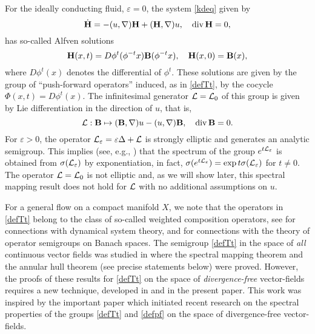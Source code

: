 For the ideally conducting fluid, $\varepsilon =0$,
the system \eqref{kdeq} given by
\begin{equation}\lb{kde}
\dot{\bH}= - (u,\nabla) {\bH} +
( {\bH}, \nabla ) u,
\quad \div{\bH}  = 0,
\end{equation}
has \cite{Moffatt} so-called Alfven solutions
\begin{equation}\lb{defpf}
{\bH}(x,t)=D\phi^t(\phi^{-t}x){\bB} (\phi^{-t}x),
\quad {\bH}(x,0)={\bB}(x),
\end{equation}
where $D\phi^t(x)$  denotes the differential of $\phi^t$.
These solutions are given by the group of ``push-forward
operators'' induced, as in \eqref{defTt},
by the cocycle $\Phi(x,t)=D\phi^t(x)$.
The infinitesimal generator
${\cal{L}}={\cal{L}}_0$ of this group is given by Lie differentiation
in the direction of $u$, that is,
\begin{equation}\lb{defL}
\calL: \bB\mapsto  (\bB,\nabla)u - (u,\nabla) \bB,\quad \div\bB=0.
\end{equation}
For $\varepsilon >0$, the operator 
${\cal{L}}_\varepsilon=\varepsilon\Delta+{\cal{L}}$ is strongly elliptic
and generates an analytic semigroup. This implies (see, e.g., \cite{Pazy})
that the spectrum of the group $e^{t{\cal{L}}_\varepsilon}$ is obtained 
from $\sigma({\cal{L}}_\varepsilon)$ by exponentiation, 
in fact,
$\sigma(e^{t{\cal{L}}_\varepsilon}) = \exp t\sigma ({\cal{L}}_\varepsilon)$ for $t\neq 0$.
The operator ${\cal{L}}={\cal{L}}_0$ is not elliptic and, as we will show later,
this spectral mapping
result does not hold for ${\cal{L}}$ with no additional assumptions on $u$. 


For a general flow on a compact manifold $X$,
we note that the operators in \eqref{defTt} belong to the 
class of so-called weighted
composition operators, see \cite{HPS,LS,Mather} for
connections with  dynamical system theory,
and \cite{LMS2,LMSFun} 
for connections with the theory of operator semigroups on Banach spaces. 
The semigroup \eqref{defTt} in the space of {\em all}
continuous vector fields was
studied in \cite{CS,J} where the spectral 
mapping theorem and the annular hull theorem (see precise statements below)
were proved. However,  the proofs of these results for
\eqref{defTt} on the space of {\em divergence-free} vector-fields
requires a new technique, 
developed in \cite{clms} and in the present paper.
This work was inspired by the
important paper \cite{Rafael} which initiated recent research 
on the spectral properties of the groups
\eqref{defTt} and \eqref{defpf} on the space of 
divergence-free vector-fields.

